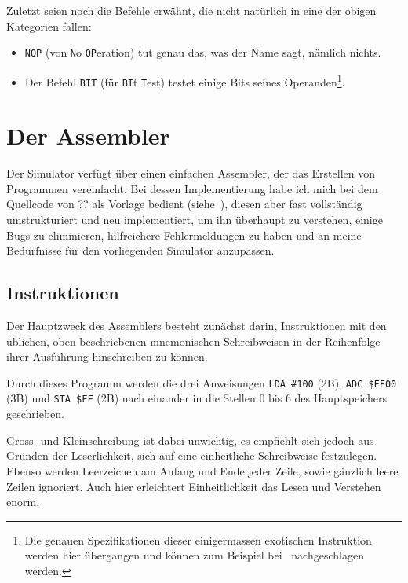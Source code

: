 \documentclass[11pt]{scrartcl}
\newcommand{\byte}{\unit{B}}
\begin{document}
Zuletzt seien noch die Befehle erwähnt, die nicht natürlich in eine
der obigen Kategorien fallen:

\begin{itemize}
\item \lstinline!NOP! (von \texttt{N}o  \texttt{OP}eration) tut genau
  das, was der Name sagt, nämlich nichts.
\item Der Befehl \lstinline!BIT! (für \texttt{BI}t \texttt{T}est)
  testet einige Bits seines Operanden\footnote{Die genauen
    Spezifikationen dieser einigermassen exotischen Instruktion werden
    hier übergangen und können zum Beispiel bei~\cite{??}
    nachgeschlagen werden.}.
\end{itemize}


\newpage
\section{Der Assembler}
\label{sec:assembler}

Der Simulator verfügt über einen einfachen Assembler, der das
Erstellen von Programmen vereinfacht. Bei dessen Implementierung habe
ich mich bei dem Quellcode von ?? als Vorlage bedient (siehe~\cite{ass}),
diesen aber fast vollständig umstrukturiert und neu implementiert,
um ihn überhaupt zu verstehen, einige Bugs zu eliminieren,
hilfreichere Fehlermeldungen zu haben und
an meine Bedürfnisse für den vorliegenden Simulator anzupassen.


\subsection{Instruktionen}
\label{sec:ass_instructions}


Der Hauptzweck des Assemblers besteht zunächst darin, Instruktionen
mit den üblichen, oben beschriebenen mnemonischen Schreibweisen in der
Reihenfolge ihrer Ausführung hinschreiben zu können.

\begin{center}
  
\end{center}

Durch dieses Programm werden die drei Anweisungen \lstinline!LDA #100!
(2\byte), \lstinline!ADC $FF00! (3\byte) und \lstinline!STA $FF!
(2\byte) nach einander in die Stellen 0 bis 6 des Hauptspeichers
geschrieben.

Gross- und Kleinschreibung ist dabei unwichtig, es empfiehlt sich
jedoch aus Gründen der Leserlichkeit, sich auf eine einheitliche
Schreibweise festzulegen. Ebenso werden Leerzeichen am Anfang und Ende
jeder Zeile, sowie gänzlich leere Zeilen ignoriert. Auch hier
erleichtert Einheitlichkeit das Lesen und Verstehen enorm.
\end{document}
